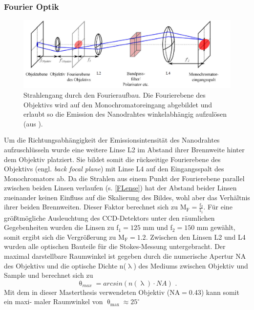 \subsubsection{Fourier Optik} \begin{figure}[h] \centering
\includegraphics[width=1\textwidth]{Bilder/Methodik/fourier}
\caption[Impulsraumabbildung]{Strahlengang durch den Fourieraufbau. Die
Fourierebene des Objektivs wird auf den Monochromatoreingang abgebildet und
erlaubt so die Emission des Nanodrahtes winkelabhängig aufzulösen (aus
\cite{Master.Michalsky}).} \label{FLense} \end{figure} \noindent Um die
Richtungsabhängigkeit der Emissionsintensität des Nanodrahtes aufzuschlüsseln
wurde eine weitere Linse L2 im Abstand ihrer Brennweite hinter dem Objektiv
platziert. Sie bildet somit die rückseitige Fourierebene des Objektivs (engl.
\textit{back focal plane}) mit Linse L4 auf den Eingangsspalt des Monochromators
ab. Da die Strahlen aus einem Punkt der Fourierebene parallel zwischen beiden
Linsen verlaufen (s. \autoref{FLense}) hat der Abstand beider Linsen zueinander
keinen Einfluss auf die Skalierung des Bildes, wohl aber das Verhältnis ihrer
beiden Brennweiten. Dieser Faktor berechnet sich zu
$\text{M}_\text{F}=\frac{\text{f}_\text{2}}{\text{f}_\text{1}}$. Für eine
größtmögliche Ausleuchtung des CCD-Detektors unter den räumlichen Gegebenheiten
wurden die Linsen zu f$_\text{1}=\text{125}$ mm und f$_\text{2}=\text{150}$ mm
gewählt, somit ergibt sich die Vergrößerung zu $\text{M}_\text{F}=\text{1.2}$.
Zwischen den Linsen L2 und L4 wurden alle optischen Bauteile für die
Stokes-Messung untergebracht. Der maximal darstellbare Raumwinkel ist gegeben
durch die numerische Apertur NA des Objektivs und die optische Dichte
n($\uplambda$) des Mediums zwischen Objektiv und Sample und berechnet sich zu
\cite{Riediger.Master} \begin{equation}
\uptheta_{max}=arcsin\left(n(\uplambda)\cdot NA\right) \text{ .} \end{equation}
Mit dem in dieser Masterthesis verwendeten Objektiv (NA$=$0.43) kann somit ein
maxi- maler Raumwinkel von $\uptheta_\text{max} \approx \text{25}^\circ$
